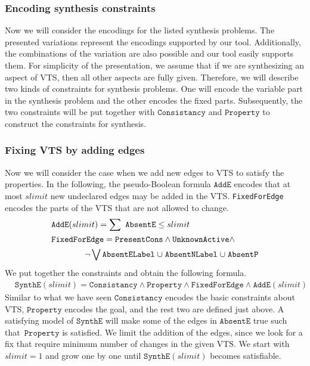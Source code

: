 
\subsubsection{Encoding synthesis constraints}

Now we will consider the encodings for the
listed synthesis problems.
%
The presented variations represent the encodings
supported by our tool.
%
Additionally, the combinations of the variation are also possible and
our tool easily supports them.
%
For simplicity of the presentation, we assume that if we are
synthesizing an aspect of VTS, then all other aspects are fully given.
%
Therefore, we will describe two kinds of constraints for synthesis
problems.
%
One will encode the variable part in the synthesis problem and
the other encodes the fixed parts.
%
Subsequently, the two constraints will be put together with 
$\texttt{Consistancy}$ and 
$\texttt{Property}$ to construct the constraints for synthesis.

\subsubsection{Fixing VTS by adding edges}
%
Now we will consider the case when we add new edges to VTS to satisfy the properties.
%
In the following, the pseudo-Boolean formula $\texttt{AddE}$ encodes
that at most $slimit$ new undeclared edges may be added in the VTS.
%
\texttt{FixedForEdge} encodes the parts of the VTS that are not allowed to change.
\begin{align*}
&\texttt{AddE}(slimit) = \sum~\texttt{AbsentE} \leq slimit\\
&\texttt{FixedForEdge} = \texttt{PresentCons} \land \texttt{UnknownActive} \land\\
& \quad\quad\quad\quad \lnot \bigvee \texttt{AbsentELabel} \;{\cup}\;
\texttt{AbsentNLabel} \;{\cup}\;
\texttt{AbsentP}
\end{align*}
We put together the constraints and obtain the following formula.
\begin{align*}
& \texttt{SynthE}(slimit) =
\texttt{Consistancy}\land \texttt{Property} \land
\texttt{FixedForEdge} \land
\texttt{AddE}(slimit)
\end{align*}
Similar to what we have seen $\texttt{Consistancy}$ encodes the basic constraints about VTS,
$\texttt{Property}$\; encodes the goal, and
the rest two are defined just above.
%
A satisfying model of $\texttt{SynthE}$ will make 
some of the edges in $\texttt{AbsentE}$ true such that~$\texttt{Property}$ is satisfied.
%
We limit the addition of the edges, since we look for a fix that require minimum number
of changes in the given VTS.
%
We start with $slimit = 1$ and grow one by one until $\texttt{SynthE}(slimit)$
becomes satisfiable.


